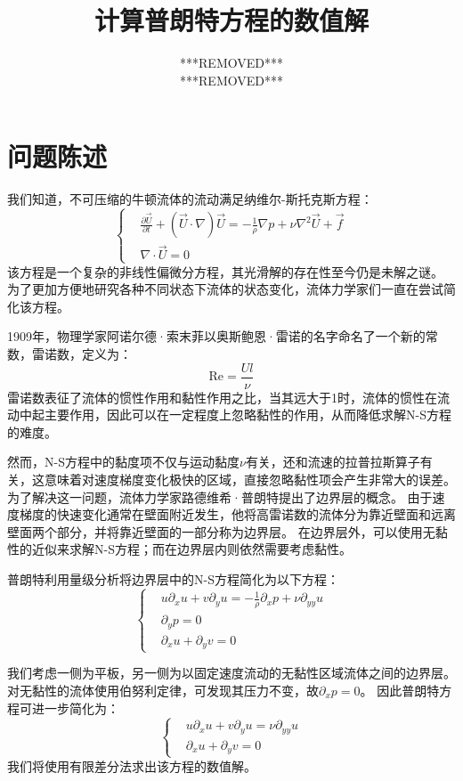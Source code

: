 \documentclass[12pt]{ctexart}
\title{计算普朗特方程的数值解}
\author{***REMOVED*** \\ ***REMOVED***}
\begin{document}
    \maketitle

\section{问题陈述}
我们知道，不可压缩的牛顿流体的流动满足纳维尔-斯托克斯方程：
\[
\left\{
\begin{aligned}
& \frac{\partial \vec U}{\partial t} + (\vec U \cdot \nabla) \vec U = - \frac{1}{\rho} \nabla p + \nu \nabla^2 \vec U + \vec f \\
& \nabla \cdot \vec U = 0
\end{aligned}
\right.
\]
该方程是一个复杂的非线性偏微分方程，其光滑解的存在性至今仍是未解之谜\cite{millenniumNSeq}。
为了更加方便地研究各种不同状态下流体的状态变化，流体力学家们一直在尝试简化该方程。

1909年，物理学家阿诺尔德·索末菲以奥斯鲍恩·雷诺的名字命名了一个新的常数，雷诺数，定义为\cite{sommerfeld1909beitrag}：
\[ \mathrm{Re} = \frac{Ul}{\nu} \]
雷诺数表征了流体的惯性作用和黏性作用之比\cite{10.1371/journal.pone.0141848}，当其远大于1时，流体的惯性在流动中起主要作用，因此可以在一定程度上忽略黏性的作用，从而降低求解N-S方程的难度。

然而，N-S方程中的黏度项不仅与运动黏度$\nu$有关，还和流速的拉普拉斯算子有关，这意味着对速度梯度变化极快的区域，直接忽略黏性项会产生非常大的误差。
为了解决这一问题，流体力学家路德维希·普朗特提出了边界层的概念\cite{Tollmien1961}。
由于速度梯度的快速变化通常在壁面附近发生，他将高雷诺数的流体分为靠近壁面和远离壁面两个部分，并将靠近壁面的一部分称为边界层。
在边界层外，可以使用无黏性的近似来求解N-S方程；而在边界层内则依然需要考虑黏性。

普朗特利用量级分析将边界层中的N-S方程简化为以下方程：
\[
    \left\{
        \begin{aligned}
            & u \partial_x u + v \partial_y u = - \frac{1}{\rho} \partial_x p + \nu \partial_{yy} u \\
            & \partial_y p = 0 \\
            & \partial_x u + \partial_y v = 0
        \end{aligned}
    \right.
\]

我们考虑一侧为平板，另一侧为以固定速度流动的无黏性区域流体之间的边界层。
对无黏性的流体使用伯努利定律，可发现其压力不变，故$\partial_x p = 0$。
因此普朗特方程可进一步简化为：
\[
    \left\{
        \begin{aligned}
            & u \partial_x u + v \partial_y u = \nu \partial_{yy} u \\
            & \partial_x u + \partial_y v = 0
        \end{aligned}
    \right.
\]
我们将使用有限差分法求出该方程的数值解。
\end{document}
